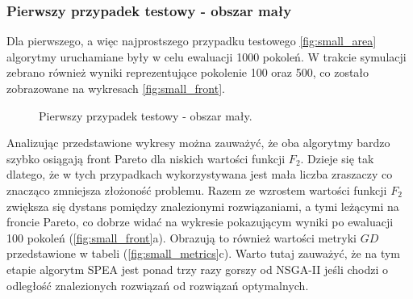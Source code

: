 \documentclass[twoside]{iisthesis}
\begin{document}
\subsubsection{Pierwszy przypadek testowy - obszar mały}
Dla pierwszego, a więc najprostszego przypadku testowego \eqref{fig:small_area} algorytmy uruchamiane były w celu ewaluacji 1000 pokoleń. W trakcie symulacji zebrano również wyniki reprezentujące pokolenie 100 oraz 500, co zostało zobrazowane na wykresach \eqref{fig:small_front}.
\begin{figure}[H]
	\centering
	\caption{Pierwszy przypadek testowy - obszar mały.}
	\label{fig:small_area}
\end{figure}
Analizując przedstawione wykresy można zauważyć, że oba algorytmy bardzo szybko osiągają front Pareto dla niskich wartości funkcji $F_{2}$. Dzieje się tak dlatego, że w tych przypadkach wykorzystywana jest mała liczba zraszaczy co znacząco zmniejsza złożoność problemu. Razem ze wzrostem wartości funkcji $F_{2}$ zwiększa się dystans pomiędzy znalezionymi rozwiązaniami, a tymi leżącymi na froncie Pareto, co dobrze widać na wykresie pokazującym wyniki po ewaluacji 100 pokoleń (\ref{fig:small_front}a). Obrazują to również wartości metryki $GD$ przedstawione w tabeli (\ref{fig:small_metrics}c). Warto tutaj zauważyć, że na tym etapie algorytm SPEA jest ponad trzy razy gorszy od NSGA-II jeśli chodzi o odległość znalezionych rozwiązań od rozwiązań optymalnych. \newpage
\end{document}
